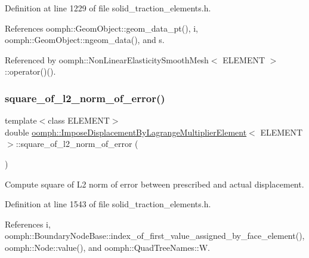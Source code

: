 Definition at line 1229 of file solid\+\_\+traction\+\_\+elements.\+h.



References oomph\+::\+Geom\+Object\+::geom\+\_\+data\+\_\+pt(), i, oomph\+::\+Geom\+Object\+::ngeom\+\_\+data(), and s.



Referenced by oomph\+::\+Non\+Linear\+Elasticity\+Smooth\+Mesh$<$ E\+L\+E\+M\+E\+N\+T $>$\+::operator()().

\mbox{\label{classoomph_1_1ImposeDisplacementByLagrangeMultiplierElement_a911c9bced8c0bdb15dbd4dd6bb2fcb5a}} 
\subsubsection{\texorpdfstring{square\+\_\+of\+\_\+l2\+\_\+norm\+\_\+of\+\_\+error()}{square\_of\_l2\_norm\_of\_error()}}
{\footnotesize\ttfamily template$<$class E\+L\+E\+M\+E\+NT$>$ \\
double \hyperlink{classoomph_1_1ImposeDisplacementByLagrangeMultiplierElement}{oomph\+::\+Impose\+Displacement\+By\+Lagrange\+Multiplier\+Element}$<$ E\+L\+E\+M\+E\+NT $>$\+::square\+\_\+of\+\_\+l2\+\_\+norm\+\_\+of\+\_\+error (\begin{DoxyParamCaption}{ }\end{DoxyParamCaption})\hspace{0.3cm}{\ttfamily [inline]}}



Compute square of L2 norm of error between prescribed and actual displacement. 



Definition at line 1543 of file solid\+\_\+traction\+\_\+elements.\+h.



References i, oomph\+::\+Boundary\+Node\+Base\+::index\+\_\+of\+\_\+first\+\_\+value\+\_\+assigned\+\_\+by\+\_\+face\+\_\+element(), oomph\+::\+Node\+::value(), and oomph\+::\+Quad\+Tree\+Names\+::W.



